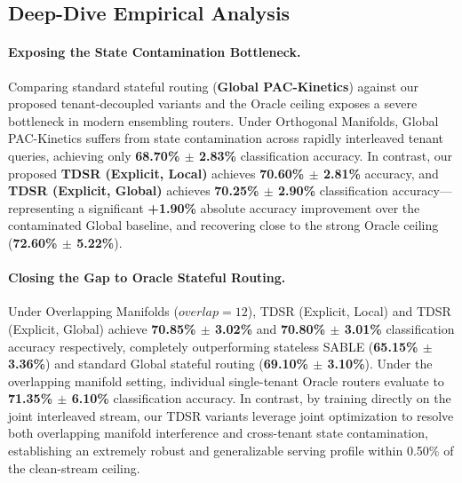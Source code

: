 \subsection{Deep-Dive Empirical Analysis}

\paragraph{Exposing the State Contamination Bottleneck.}
Comparing standard stateful routing (\textbf{Global PAC-Kinetics}) against our proposed tenant-decoupled variants and the Oracle ceiling exposes a severe bottleneck in modern ensembling routers. Under Orthogonal Manifolds, Global PAC-Kinetics suffers from state contamination across rapidly interleaved tenant queries, achieving only \textbf{68.70\% $\pm$ 2.83\%} classification accuracy. In contrast, our proposed \textbf{TDSR (Explicit, Local)} achieves \textbf{70.60\% $\pm$ 2.81\%} accuracy, and \textbf{TDSR (Explicit, Global)} achieves \textbf{70.25\% $\pm$ 2.90\%} classification accuracy—representing a significant \textbf{+1.90\%} absolute accuracy improvement over the contaminated Global baseline, and recovering close to the strong Oracle ceiling (\textbf{72.60\% $\pm$ 5.22\%}).

\paragraph{Closing the Gap to Oracle Stateful Routing.}
Under Overlapping Manifolds ($overlap=12$), TDSR (Explicit, Local) and TDSR (Explicit, Global) achieve \textbf{70.85\% $\pm$ 3.02\%} and \textbf{70.80\% $\pm$ 3.01\%} classification accuracy respectively, completely outperforming stateless SABLE (\textbf{65.15\% $\pm$ 3.36\%}) and standard Global stateful routing (\textbf{69.10\% $\pm$ 3.10\%}). Under the overlapping manifold setting, individual single-tenant Oracle routers evaluate to \textbf{71.35\% $\pm$ 6.10\%} classification accuracy. In contrast, by training directly on the joint interleaved stream, our TDSR variants leverage joint optimization to resolve both overlapping manifold interference and cross-tenant state contamination, establishing an extremely robust and generalizable serving profile within 0.50\% of the clean-stream ceiling.

